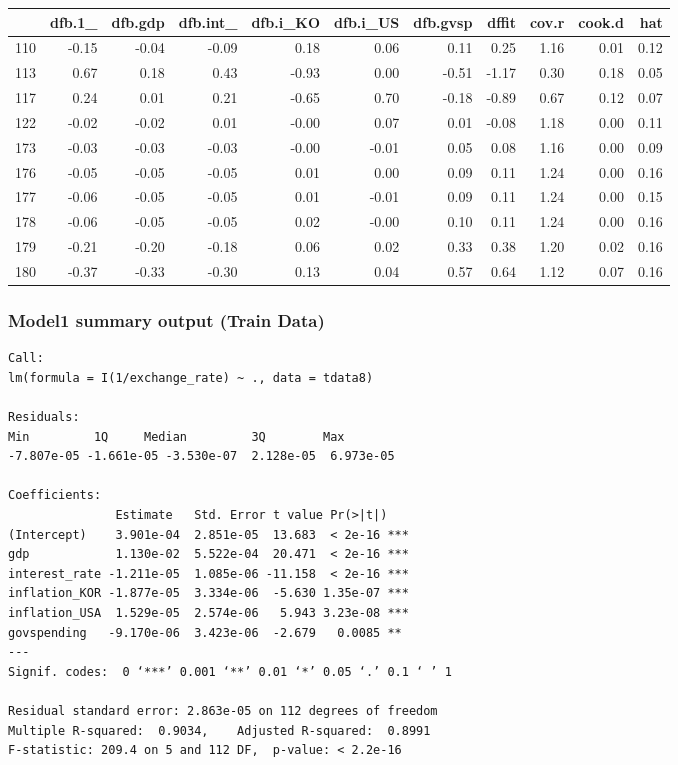 \documentclass[12pt]{article}
\begin{document}
\begin{table}[ht]
\centering
\begin{tabular}{rrrrrrrrrrr}
  \hline
 & dfb.1\_ & dfb.gdp & dfb.int\_ & dfb.i\_KO & dfb.i\_US & dfb.gvsp & dffit & cov.r & cook.d & hat \\
  \hline
110 & -0.15 & -0.04 & -0.09 & 0.18 & 0.06 & 0.11 & 0.25 & 1.16 & 0.01 & 0.12 \\
  113 & 0.67 & 0.18 & 0.43 & -0.93 & 0.00 & -0.51 & -1.17 & 0.30 & 0.18 & 0.05 \\
  117 & 0.24 & 0.01 & 0.21 & -0.65 & 0.70 & -0.18 & -0.89 & 0.67 & 0.12 & 0.07 \\
  122 & -0.02 & -0.02 & 0.01 & -0.00 & 0.07 & 0.01 & -0.08 & 1.18 & 0.00 & 0.11 \\
  173 & -0.03 & -0.03 & -0.03 & -0.00 & -0.01 & 0.05 & 0.08 & 1.16 & 0.00 & 0.09 \\
  176 & -0.05 & -0.05 & -0.05 & 0.01 & 0.00 & 0.09 & 0.11 & 1.24 & 0.00 & 0.16 \\
  177 & -0.06 & -0.05 & -0.05 & 0.01 & -0.01 & 0.09 & 0.11 & 1.24 & 0.00 & 0.15 \\
  178 & -0.06 & -0.05 & -0.05 & 0.02 & -0.00 & 0.10 & 0.11 & 1.24 & 0.00 & 0.16 \\
  179 & -0.21 & -0.20 & -0.18 & 0.06 & 0.02 & 0.33 & 0.38 & 1.20 & 0.02 & 0.16 \\
  180 & -0.37 & -0.33 & -0.30 & 0.13 & 0.04 & 0.57 & 0.64 & 1.12 & 0.07 & 0.16 \\
   \hline
\end{tabular}
\end{table}

\subsubsection{Model1 summary output (Train Data)\label{m1:train}}
\begin{verbatim}
Call:
lm(formula = I(1/exchange_rate) ~ ., data = tdata8)

Residuals:
Min         1Q     Median         3Q        Max 
-7.807e-05 -1.661e-05 -3.530e-07  2.128e-05  6.973e-05 

Coefficients:
               Estimate   Std. Error t value Pr(>|t|)    
(Intercept)    3.901e-04  2.851e-05  13.683  < 2e-16 ***
gdp            1.130e-02  5.522e-04  20.471  < 2e-16 ***
interest_rate -1.211e-05  1.085e-06 -11.158  < 2e-16 ***
inflation_KOR -1.877e-05  3.334e-06  -5.630 1.35e-07 ***
inflation_USA  1.529e-05  2.574e-06   5.943 3.23e-08 ***
govspending   -9.170e-06  3.423e-06  -2.679   0.0085 ** 
---
Signif. codes:  0 ‘***’ 0.001 ‘**’ 0.01 ‘*’ 0.05 ‘.’ 0.1 ‘ ’ 1

Residual standard error: 2.863e-05 on 112 degrees of freedom
Multiple R-squared:  0.9034,	Adjusted R-squared:  0.8991 
F-statistic: 209.4 on 5 and 112 DF,  p-value: < 2.2e-16
\end{verbatim}
\end{document}
